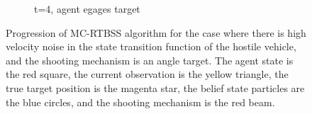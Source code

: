 \begin{figure}
\begin{subfigure}[b]{0.3\textwidth}
	            \caption{t=4, agent egages target}
	            \label{fig:high_vel_noise_t_4}
	    \end{subfigure}
	    \caption{Progression of MC-RTBSS algorithm for the case where there is high velocity noise in the state transition function of the hostile vehicle, and the shooting mechanism is an angle target. The agent state is the red square, the current observation is the yellow triangle, the true target position is the magenta star, the belief state particles are the blue circles, and the shooting mechanism is the red beam.}\label{fig:vel_noise}
	\end{figure}